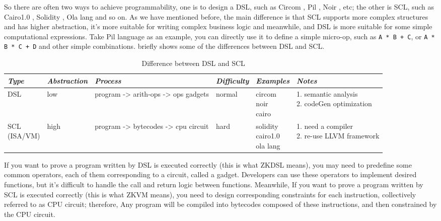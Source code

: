 So there are often two ways to achieve programmability, one is to design a DSL, such as Circom \cite{website:Circom}, Pil \cite{website:Pil}, Noir \cite{website:Noir}, etc; the other is SCL, 
such as Cairo1.0 \cite{website:Cairo1.0}, Solidity \cite{website:Solidity}, Ola lang \cite{website:Ola-lang} and so on. As we have mentioned before, the main difference is that SCL supports more complex structures and has 
higher abstraction, it's more suitable for writing complex business logic and meanwhile, and DSL is more suitable for some simple computational expressions. 
Take Pil \cite{website:Pil} language as an example, you can directly use it to define a simple micro-op, such as \verb|A * B + C|, or \verb|A * B * C + D| and other simple combinations. 
 briefly shows some of the differences between DSL and SCL.

\begin{table}[!ht]
    \centering
    \begin{tabular}{|l|l|l|l|l|l|}
        \hline
        \emph{Type} & \emph{Abstraction} & \emph{Process} & \emph{Difficulty} & \emph{Examples} & \emph{Notes} \\ 
        \hline
        DSL & low & program -> arith-ops -> ops gadgets & normal & \makecell{circom \\ noir \\ cairo} & \makecell{1. semantic analysis \\ 2. codeGen optimization} \\
        \hline
        \makecell{SCL \\ (ISA/VM)} & high & program -> bytecodes -> cpu circuit & hard & \makecell{solidity \\ cairo1.0 \\ ola lang} & \makecell{1. need a compiler \\2. re-use LLVM framework} \\
        \hline
    \end{tabular}
    \caption{Difference between DSL and SCL}
    \label{table:Difference between DSL and SCL}
\end{table}

If you want to prove a program written by DSL is executed correctly (this is what ZKDSL means), you may need to predefine some common operators, each of them corresponding to a circuit, called a gadget\cite{website:Gadget}. 
Developers can use these operators to implement desired functions, but it's difficult to handle the call and return logic between functions. Meanwhile, If you want to prove a program written by SCL is executed correctly (this is what ZKVM means), 
 you need to design corresponding constraints for each instruction, collectively referred to as CPU circuit; therefore, Any program will be compiled into 
 bytecodes composed of these instructions, and then constrained by the CPU circuit.

